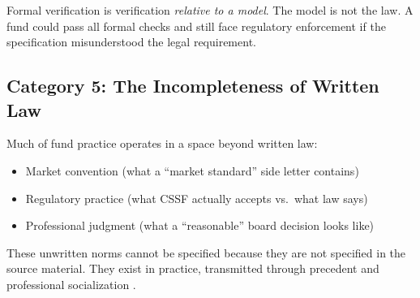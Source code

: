 Formal verification is verification \textit{relative to a model}. The model is not the law. A fund could pass all formal checks and still face regulatory enforcement if the specification misunderstood the legal requirement.

\subsection{Category 5: The Incompleteness of Written Law}
\label{sec:incompleteness}

Much of fund practice operates in a space beyond written law:

\begin{itemize}
  \item Market convention (what a ``market standard'' side letter contains)
  \item Regulatory practice (what CSSF actually accepts vs.\ what law says)
  \item Professional judgment (what a ``reasonable'' board decision looks like)
\end{itemize}

These unwritten norms cannot be specified because they are not specified in the source material. They exist in practice, transmitted through precedent and professional socialization \citep{macaulay1963non}.
